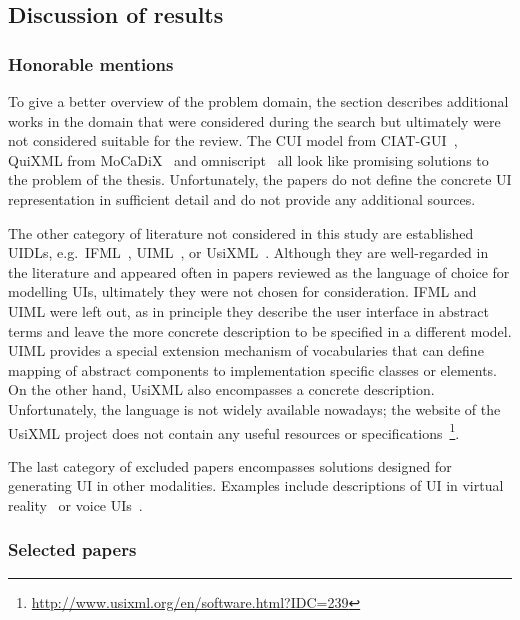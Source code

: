 \subsection{Discussion of results}\label{subsec:discussion-of-results}

\subsubsection{Honorable mentions}
To give a better overview of the problem domain, the section describes additional works in the domain that were considered during the search but ultimately were not considered suitable for the review.
The CUI model from CIAT-GUI~\cite{Molina2012-my}, QuiXML from MoCaDiX~\cite{Vanderdonckt2019-av} and omniscript~\cite{Ulusoy2019-jh} all look like promising solutions to the problem of the thesis.
Unfortunately, the papers do not define the concrete UI representation in sufficient detail and do not provide any additional sources.

The other category of literature not considered in this study are established UIDLs, e.g.\ IFML~\cite{Brambilla2014-ln}, UIML~\cite{Abrams1999}, or UsiXML~\cite{Limbourg2005}.
Although they are well-regarded in the literature and appeared often in papers reviewed as the language of choice for modelling UIs, ultimately they were not chosen for consideration.
IFML and UIML were left out, as in principle they describe the user interface in abstract terms and leave the more concrete description to be specified in a different model.
UIML provides a special extension mechanism of vocabularies that can define mapping of abstract components to implementation specific classes or elements.
On the other hand, UsiXML also encompasses a concrete description.
Unfortunately, the language is not widely available nowadays;
the website of the UsiXML project does not contain any useful resources or specifications~\footnote{\url{http://www.usixml.org/en/software.html?IDC=239}}.

The last category of excluded papers encompasses solutions designed for generating UI in other modalities.
Examples include descriptions of UI in virtual reality~\cite{Olmedo2015} or voice UIs~\cite{steinberger2020domain}.

\subsubsection{Selected papers}


